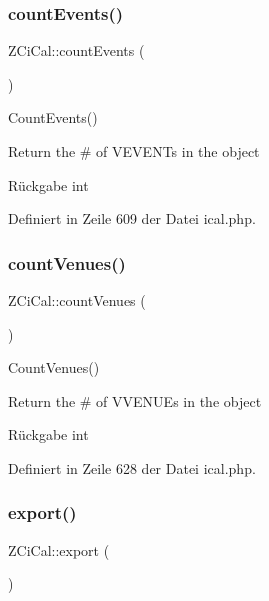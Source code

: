 \subsubsection{\texorpdfstring{count\+Events()}{countEvents()}}
{\footnotesize\ttfamily Z\+Ci\+Cal\+::count\+Events (\begin{DoxyParamCaption}{ }\end{DoxyParamCaption})}

Count\+Events()

Return the \# of V\+E\+V\+E\+N\+Ts in the object

\begin{DoxyReturn}{Rückgabe}
int 
\end{DoxyReturn}


Definiert in Zeile 609 der Datei ical.\+php.

\mbox{\label{class_z_ci_cal_a42cb8c07e556085f8851534b51131c31}} 
\subsubsection{\texorpdfstring{count\+Venues()}{countVenues()}}
{\footnotesize\ttfamily Z\+Ci\+Cal\+::count\+Venues (\begin{DoxyParamCaption}{ }\end{DoxyParamCaption})}

Count\+Venues()

Return the \# of V\+V\+E\+N\+U\+Es in the object

\begin{DoxyReturn}{Rückgabe}
int 
\end{DoxyReturn}


Definiert in Zeile 628 der Datei ical.\+php.

\mbox{\label{class_z_ci_cal_acfb2970b97e2dd3cdba13ba5dc9a1514}} 
\subsubsection{\texorpdfstring{export()}{export()}}
{\footnotesize\ttfamily Z\+Ci\+Cal\+::export (\begin{DoxyParamCaption}{ }\end{DoxyParamCaption})}

